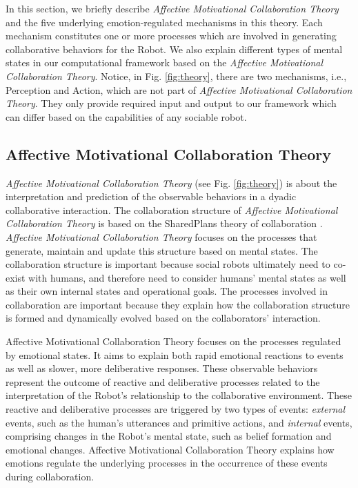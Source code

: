 In this section, we briefly describe \textit{Affective Motivational
Collaboration Theory} and the five underlying emotion-regulated mechanisms in
this theory. Each mechanism constitutes one or more processes which are involved
in generating collaborative behaviors for the Robot. We also explain different
types of mental states in our computational framework based on the
\textit{Affective Motivational Collaboration Theory}. Notice, in Fig.
\ref{fig:theory}, there are two mechanisms, i.e., Perception and Action, which
are not part of \textit{Affective Motivational Collaboration Theory}. They only
provide required input and output to our framework which can differ based on the
capabilities of any sociable robot.

\subsection{Affective Motivational Collaboration Theory}
\label{sec:AMCT}

\textit{Affective Motivational Collaboration Theory} (see Fig. \ref{fig:theory})
is about the interpretation and prediction of the observable behaviors in a
dyadic collaborative interaction. The collaboration structure of
\textit{Affective Motivational Collaboration Theory} is based on the SharedPlans
theory of collaboration
\cite{grosz:planning-acting,grosz:collaboration,grosz:plans-discourse}.
\textit{Affective Motivational Collaboration Theory} focuses on the processes
that generate, maintain and update this structure based on mental states. The
collaboration structure is important because social robots ultimately need to
co-exist with humans, and therefore need to consider humans' mental states as
well as their own internal states and operational goals. The processes involved
in collaboration are important because they explain how the collaboration
structure is formed and dynamically evolved based on the collaborators'
interaction.

Affective Motivational Collaboration Theory focuses on the processes regulated
by emotional states. It aims to explain both rapid emotional reactions to events
as well as slower, more deliberative responses. These observable behaviors
represent the outcome of reactive and deliberative processes related to the
interpretation of the Robot's relationship to the collaborative environment.
These reactive and deliberative processes are triggered by two types of events:
\textit{external} events, such as the human's utterances and primitive actions,
and \textit{internal} events, comprising changes in the Robot's mental state,
such as belief formation and emotional changes. Affective Motivational
Collaboration Theory explains how emotions regulate the underlying processes in
the occurrence of these events during collaboration.

